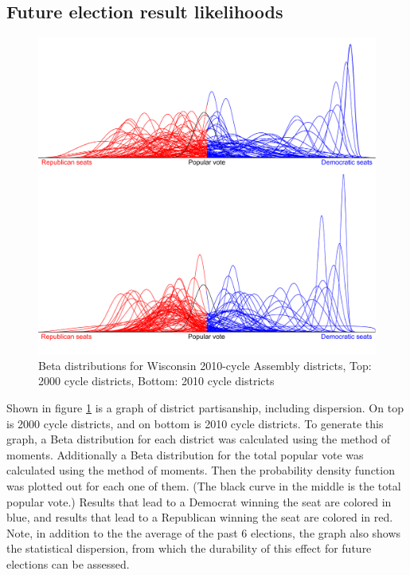 \documentclass[preprint,12pt]{article}
\begin{document}
\subsection{Future election result likelihoods}

\begin{figure}[htb!]
    \begin{center}
        \includegraphics[scale=0.25]{../Figures/WI_compared/Betas_cropped.png}
        \caption{Beta distributions for Wisconsin 2010-cycle Assembly districts, Top: 2000 cycle districts, Bottom: 2010 cycle districts}\label{fig:Betas}
    \end{center}
\end{figure}
 
Shown in figure \ref{fig:Betas} is a graph of district partisanship, including dispersion.  On top is 2000 cycle districts, and on bottom is 2010 cycle districts.   To generate this graph, a Beta distribution for each district was calculated using the method of moments.  Additionally a Beta distribution for the total popular vote was calculated using the method of moments.  Then the probability density function was plotted out for each one of them.  (The black curve in the middle is the total popular vote.) Results that lead to a Democrat winning the seat are colored in blue, and results that lead to a Republican winning the seat are colored in red.
Note, in addition to the the average of the past 6 elections, the graph also shows the statistical dispersion, from which the durability of this effect for future elections can be assessed.
\end{document}
